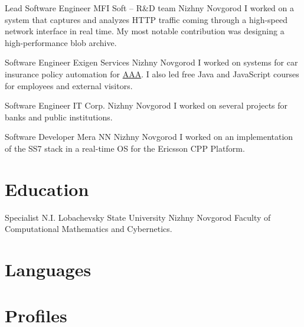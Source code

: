 \documentclass[11pt,a4paper,sans]{moderncv}
\begin{document}
{Lead Software Engineer}
{MFI Soft -- R\&D team}
{Nizhny Novgorod}
{}
{
  I worked on a system that captures and analyzes HTTP traffic coming through a high-speed network interface in real time.
  My most notable contribution was designing a high-performance blob archive.
}

{Software Engineer}
{Exigen Services}
{Nizhny Novgorod}
{}
{
  I worked on systems for car insurance policy automation for \href{https://aaa.com}{AAA}.
  I also led free Java and JavaScript courses for employees and external visitors.
}

{Software Engineer}
{IT Corp.}
{Nizhny Novgorod}
{}
{ I worked on several projects for banks and public institutions. }

{Software Developer}
{Mera NN}
{Nizhny Novgorod}
{}
{
  I worked on an implementation of the SS7 stack in a real-time OS for the Ericsson CPP Platform.
}

\section{Education}
{Specialist}
{N.I. Lobachevsky State University}
{Nizhny Novgorod}
{}
{Faculty of Computational Mathematics and Cybernetics.}

\section{Languages}

\section{Profiles}
\end{document}
